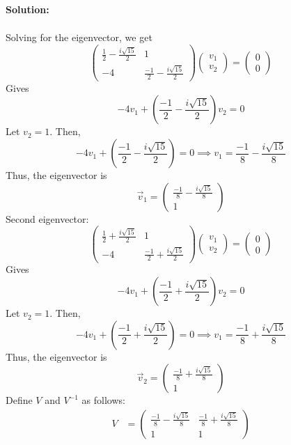 \documentclass[12pt]{article}
\newenvironment{solution}{
    \textbf{Solution:}
    
}{
    
    \vspace{2em}
}
\begin{document}
\begin{solution}
\[\begin{aligned}
        \end{aligned}
    \]
    Solving for the eigenvector, we get
    \[
        \begin{pmatrix} \frac{1}{2} - \frac{i\sqrt{15}}{2} & 1 \\ -4 & \frac{-1}{2} - \frac{i\sqrt{15}}{2} \end{pmatrix} \begin{pmatrix} v_1 \\ v_2 \end{pmatrix} = \begin{pmatrix} 0 \\ 0 \end{pmatrix}
    \]
    Gives
    \[
        -4v_1 + \left(\frac{-1}{2} - \frac{i\sqrt{15}}{2}\right)v_2 = 0
    \]
    Let \(v_2 = 1\). Then,
    \[
        -4v_1 + \left(\frac{-1}{2} - \frac{i\sqrt{15}}{2}\right) = 0 \implies v_1 = \frac{-1}{8} - \frac{i\sqrt{15}}{8}
    \]
    Thus, the eigenvector is
    \[
        \vec{v}_1 = \begin{pmatrix} \frac{-1}{8} - \frac{i\sqrt{15}}{8} \\ 1 \end{pmatrix}
    \]
    Second eigenvector:
    \[
        \begin{pmatrix} \frac{1}{2} + \frac{i\sqrt{15}}{2} & 1 \\ -4 & \frac{-1}{2} + \frac{i\sqrt{15}}{2} \end{pmatrix} \begin{pmatrix} v_1 \\ v_2 \end{pmatrix} = \begin{pmatrix} 0 \\ 0 \end{pmatrix}
    \]
    Gives
    \[
        -4v_1 + \left(\frac{-1}{2} + \frac{i\sqrt{15}}{2}\right)v_2 = 0
    \]
    Let \(v_2 = 1\). Then,
    \[
        -4v_1 + \left(\frac{-1}{2} + \frac{i\sqrt{15}}{2}\right) = 0 \implies v_1 = \frac{-1}{8} + \frac{i\sqrt{15}}{8}
    \]
    Thus, the eigenvector is
    \[
        \vec{v}_2 = \begin{pmatrix} \frac{-1}{8} + \frac{i\sqrt{15}}{8} \\ 1 \end{pmatrix}
    \]
    Define \(V\) and \(V^{-1}\) as follows:
    \[
        \begin{aligned}
            V &= \begin{pmatrix} \frac{-1}{8} - \frac{i\sqrt{15}}{8} & \frac{-1}{8} + \frac{i\sqrt{15}}{8} \\ 1 & 1 \end{pmatrix} \\

\end{aligned}\]
\end{solution}
\end{document}
